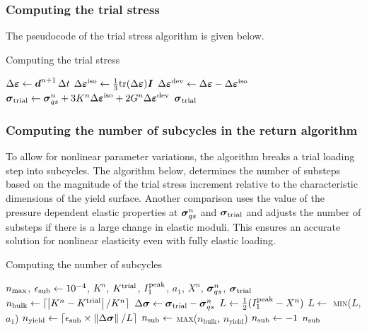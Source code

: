 \subsubsection{Computing the trial stress}
  The pseudocode of the trial stress algorithm is given below.
\begin{breakablealgorithm}
  \caption{Computing the trial stress}
  \begin{algorithmic}[1]
      \State $\Delta\boldsymbol{\varepsilon} \leftarrow \boldsymbol{d}^{n+1}\,\Delta t$
      \State $\Delta\boldsymbol{\varepsilon}^{\text{iso}} \leftarrow \tfrac{1}{3} \text{tr}(\Delta\boldsymbol{\varepsilon}) \boldsymbol{I}$
      \State $\Delta\boldsymbol{\varepsilon}^{\text{dev}} \leftarrow \Delta\boldsymbol{\varepsilon} - \Delta\boldsymbol{\varepsilon}^{\text{iso}}$
      \State $\boldsymbol{\sigma}_{\text{trial}} \leftarrow \boldsymbol{\sigma}_{qs}^n + 3 K^n \Delta\boldsymbol{\varepsilon}^{\text{iso}} 
               + 2 G^n \Delta\boldsymbol{\varepsilon}^{\text{dev}}$ 
      \State \Return $\boldsymbol{\sigma}_{\text{trial}}$
    \EndProcedure
  \end{algorithmic}
\end{breakablealgorithm}

\subsubsection{Computing the number of subcycles in the return algorithm}
To allow for nonlinear parameter variations, the algorithm breaks a trial loading step into
subcycles.  The algorithm below, determines the number of substeps based on the magnitude of
the trial stress increment relative to the characteristic dimensions of the yield surface.  Another
comparison uses the value of the pressure dependent elastic properties at $\boldsymbol{\sigma}_{qs}^n$ and
$\boldsymbol{\sigma}_{\text{trial}}$ and adjusts the number of substeps if there is a large change in elastic moduli.
This ensures an accurate solution for nonlinear elasticity even with fully elastic loading.


\begin{breakablealgorithm}
  \caption{Computing the number of subcycles}
  \begin{algorithmic}[1]
    \Require $n_{\text{max}}$, $\epsilon_{\text{sub}} \leftarrow 10^{-4}$, $K^n$, $K^{\text{trial}}$, 
       $I_1^{\text{peak}}$, $a_1$, $X^n$, $\boldsymbol{\sigma}_{qs}^n$, $\boldsymbol{\sigma}_{\text{trial}}$
      \State $n_{\text{bulk}} \leftarrow \lceil\left|K^n - K^{\text{trial}}\right|/K^n\rceil$  
      \State $\Delta\boldsymbol{\sigma} \leftarrow \boldsymbol{\sigma}_{\text{trial}} - \boldsymbol{\sigma}_{qs}^n$
      \State $L \leftarrow \tfrac{1}{2}(I_1^{\text{peak}} - X^n)$
        \State $L \leftarrow $ \textsc{min}($L$, $a_1$)
      \EndIf
      \State $n_{\text{yield}} \leftarrow \lceil\epsilon_{\text{sub}} \times \left\lVert\Delta\boldsymbol{\sigma}\right\rVert_{}/L\rceil$
      \State $n_{\text{sub}} \leftarrow$ \textsc{max}($n_\text{bulk}$, $n_\text{yield}$)
        \State $n_{\text{sub}} \leftarrow -1$
      \EndIf
      \State \Return $n_{\text{sub}}$
    \EndProcedure
  \end{algorithmic}
\end{breakablealgorithm}

